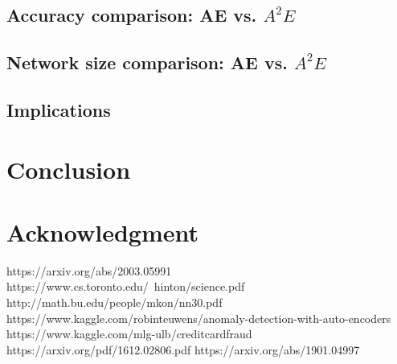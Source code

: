 \documentclass[conference]{IEEEtran}
\begin{document}
\subsection{Accuracy comparison: AE vs. $A^2E$}

\subsection{Network size comparison: AE vs. $A^2E$}

\subsection{Implications}

\section{Conclusion}

\section*{Acknowledgment}

\begin{thebibliography}{00}
    https://arxiv.org/abs/2003.05991
    https://www.cs.toronto.edu/~hinton/science.pdf
    http://math.bu.edu/people/mkon/nn30.pdf
    https://www.kaggle.com/robinteuwens/anomaly-detection-with-auto-encoders
    https://www.kaggle.com/mlg-ulb/creditcardfraud
    https://arxiv.org/pdf/1612.02806.pdf
    https://arxiv.org/abs/1901.04997
\end{thebibliography}

\vspace{12pt}
\color{red}
\end{document}
